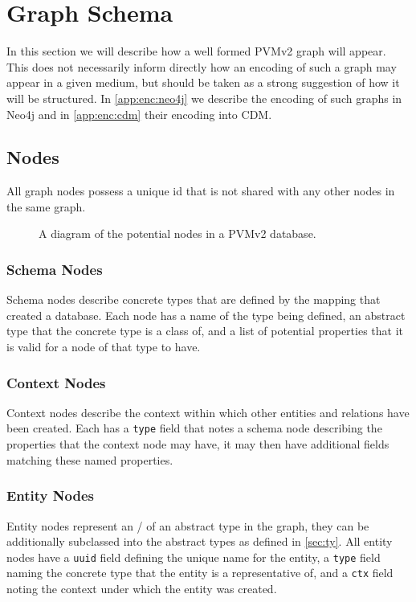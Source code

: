 \documentclass[12pt,twoside,a4paper]{article}
\newcommand{\field}[1]{\texttt{#1}}
\begin{document}
\section{Graph Schema}
\label{sec:gs}
In this section we will describe how a well formed PVMv2 graph will appear. This does not necessarily inform directly how an encoding of such a graph may appear in a given medium, but should be taken as a strong suggestion of how it will be structured. 
In \autoref{app:enc:neo4j} we describe the encoding of such graphs in Neo4j and in \autoref{app:enc:cdm} their encoding into CDM.

\subsection{Nodes}
\label{sec:gs:node}
All graph nodes possess a unique id that is not shared with any other nodes in the same graph.

\begin{figure}[h]
\centering

\caption{A diagram of the potential nodes in a PVMv2 database.}
\label{fig:nodes}
\end{figure}

\subsubsection{Schema Nodes}
\label{sec:gs:node:schema}
Schema nodes describe concrete types that are defined by the mapping that created a database. Each node has a name of the type being defined, an abstract type that the concrete type is a class of, and a list of potential properties that it is valid for a node of that type to have.

\subsubsection{Context Nodes}
\label{sec:gs:node:context}
Context nodes describe the context within which other entities and relations have been created. Each has a \field{type} field that notes a schema node describing the properties that the context node may have, it may then have additional fields matching these named properties.

\subsubsection{Entity Nodes}
\label{sec:gs:node:entity}
Entity nodes represent an \Entity/ of an abstract type in the graph, they can be additionally subclassed into the abstract types as defined in \autoref{sec:ty}. All entity nodes have a \field{uuid} field defining the unique name for the entity, a \field{type} field naming the concrete type that the entity is a representative of, and a \field{ctx} field noting the context under which the entity was created.
\end{document}
